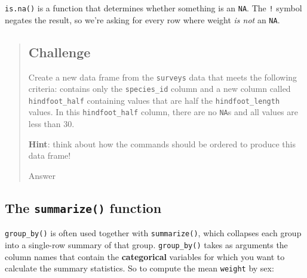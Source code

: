 \documentclass[]{book}
\newenvironment{Shaded}{\begin{snugshade}}{\end{snugshade}}
\newcommand{\KeywordTok}[1]{\textcolor[rgb]{0.13,0.29,0.53}{\textbf{#1}}}
\newcommand{\DataTypeTok}[1]{\textcolor[rgb]{0.13,0.29,0.53}{#1}}
\newcommand{\DecValTok}[1]{\textcolor[rgb]{0.00,0.00,0.81}{#1}}
\newcommand{\StringTok}[1]{\textcolor[rgb]{0.31,0.60,0.02}{#1}}
\newcommand{\OperatorTok}[1]{\textcolor[rgb]{0.81,0.36,0.00}{\textbf{#1}}}
\newcommand{\NormalTok}[1]{#1}
\begin{document}
\texttt{is.na()} is a function that determines whether something is an
\texttt{NA}. The \texttt{!} symbol negates the result, so we're asking
for every row where weight \emph{is not} an \texttt{NA}.

\begin{quote}
\subsection{Challenge}\label{challenge-5}

Create a new data frame from the \texttt{surveys} data that meets the
following criteria: contains only the \texttt{species\_id} column and a
new column called \texttt{hindfoot\_half} containing values that are
half the \texttt{hindfoot\_length} values. In this
\texttt{hindfoot\_half} column, there are no \texttt{NA}s and all values
are less than 30.

\textbf{Hint}: think about how the commands should be ordered to produce
this data frame!

Answer

\begin{Shaded}
\end{Shaded}
\end{quote}

\subsection{\texorpdfstring{The \texttt{summarize()}
function}{The summarize() function}}\label{the-summarize-function}

\texttt{group\_by()} is often used together with \texttt{summarize()},
which collapses each group into a single-row summary of that group.
\texttt{group\_by()} takes as arguments the column names that contain
the \textbf{categorical} variables for which you want to calculate the
summary statistics. So to compute the mean \texttt{weight} by sex:
\end{document}
